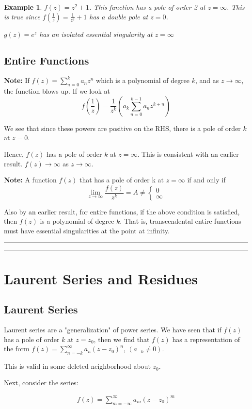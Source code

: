 \documentclass{article}
\newtheorem{ex}{Example}
\theoremstyle{definition}
\newcommand{\Section}[1]{\hrule\hrule\section{#1}}
\begin{document}
\begin{ex}
	$f(z) = z^2+1$. This function has a pole of order 2 at $z=\infty$. This is true since $f(\frac{1}{z}) = \frac{1}{z^2}+1$ has a double pole at $z=0$. 
	
	$g(z) = e^z$ has an isolated essential singularity at $z=\infty$
\end{ex}

\subsection{Entire Functions}

\textbf{Note:} If $f(z) = \sum_{n=0}^k a_nz^n$ which is a polynomial of degree $k$, and as $z \to \infty$, the function blows up. If we look at 
$$f(\frac{1}{z}) = \frac{1}{z^k}\left(a_k \sum_{n=0}^{k-1} a_n z^{k+n}\right)$$

We see that since these powers are positive on the RHS, there is a pole of order $k$ at $z=0$. 

Hence, $f(z)$ has a pole of order $k$ at $z=\infty$. This is consistent with an earlier result. $f(z) \to \infty$ as $z \to \infty$. 

\textbf{Note: } A function $f(z)$ that has a pole of order k at $z= \infty$ if and only if 
$$\lim_{z\to\infty} \frac{f(z)}{z^k} = A \neq \begin{cases}
0 \\ \infty 
\end{cases}$$


Also by an earlier result, for entire functions, if the above condition is satisfied, then $f(z)$ is a polynomial of degree $k$. That is, transcendental entire functions must have essential singularities at the point at infinity. 

\Section{Laurent Series and Residues}
\subsection{Laurent Series}
Laurent series are a "generalization" of power series. We have seen that if $f(z)$ has a pole of order $k$ at $z=z_0$, then we find that $f(z)$ has a representation of the form $f(z) = \sum_{n=-k}^\infty a_n(z-z_0)^n$, $(a_{-k} \neq 0)$. 

This is valid in some deleted neighborhood about $z_0$. 

Next, consider the series:

\begin{align}
f(z) = \sum_{m=-\infty}^{\infty} a_m(z-z_0)^m
\end{align}
\end{document}

